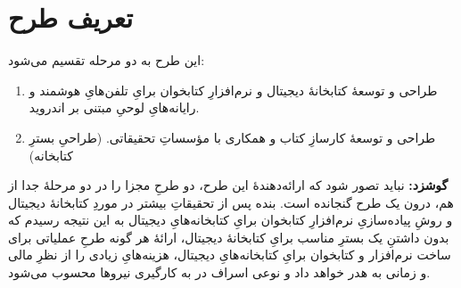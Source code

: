 \documentclass[]{article}
\begin{document}
\section{تعریف طرح}
این طرح به دو مرحله تقسیم می‌شود:
\begin{enumerate}
	\item طراحی و توسعهٔ کتابخانهٔ دیجیتال و نرم‌افزارِ کتابخوان برایِ تلفن‌هایِ هوشمند و رایانه‌هایِ لوحیِ مبتنی بر اندروید.
	\item طراحی و توسعهٔ کارسازِ کتاب و همکاری با مؤسساتِ تحقیقاتی. (طراحیِ بسترِ کتابخانه)
\end{enumerate}
\textbf{گوشزد:}
نباید تصور شود که ارائه‌دهندهٔ این طرح، دو طرحِ مجزا را در دو مرحلهٔ جدا از هم، درون یک طرح گنجانده است. بنده پس از تحقیقاتِ بیشتر در موردِ کتابخانهٔ دیجیتال و روشِ پیاده‌سازیِ نرم‌افزارِ کتابخوان برایِ کتابخانه‌هایِ دیجیتال به این نتیجه رسیدم که بدون داشتنِ یک بسترِ مناسب برایِ کتابخانهٔ دیجیتال، ارائهٔ هر گونه طرحِ عملیاتی برای ساخت نرم‌افزار و کتابخوان برایِ کتابخانه‌هایِ دیجیتال، هزینه‌هایِ زیادی را از نظرِ مالی و زمانی به هدر خواهد داد و نوعی اسراف در به کارگیری نیروها محسوب می‌شود.
\end{document}
